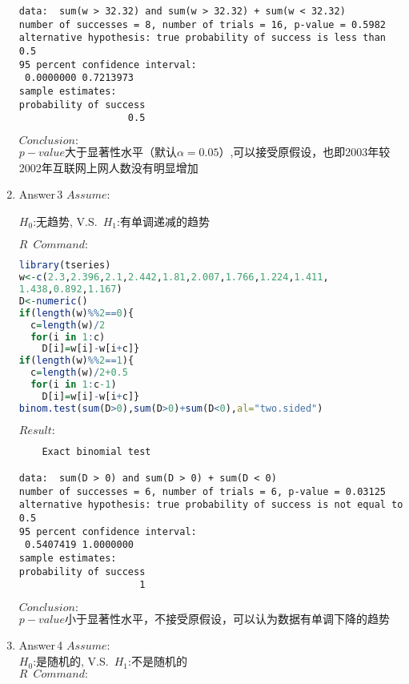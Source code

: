 \documentclass[UTF8,a4paper]{ctexart}
\begin{document}
\begin{enumerate}
\begin{verbatim}
data:  sum(w > 32.32) and sum(w > 32.32) + sum(w < 32.32)
number of successes = 8, number of trials = 16, p-value = 0.5982
alternative hypothesis: true probability of success is less than 0.5
95 percent confidence interval:
 0.0000000 0.7213973
sample estimates:
probability of success 
                   0.5 
\end{verbatim}
\textcolor[rgb]{0.28,0.9,0.8} {\large \textbf{$ Conclusion:$}}\\
$p-value$大于显著性水平（默认$\alpha =0.05$）,可以接受原假设，也即2003年较2002年互联网上网人数没有明显增加

\item Answer\,3
{\color{yellow} \large \textbf{$Assume:$}}\\
\begin{center}
\emph{$H_0$}:无趋势,\,\,V.S.\,\,\,\emph{$H_1$}:有单调递减的趋势
\end{center}
{\color{blue} \large \textbf{$R\,\,\, Command:$}}\\
\begin{lstlisting}[language=R]
library(tseries)
w<-c(2.3,2.396,2.1,2.442,1.81,2.007,1.766,1.224,1.411,
1.438,0.892,1.167)
D<-numeric()
if(length(w)%%2==0){
  c=length(w)/2
  for(i in 1:c)
    D[i]=w[i]-w[i+c]}
if(length(w)%%2==1){
  c=length(w)/2+0.5
  for(i in 1:c-1)
    D[i]=w[i]-w[i+c]}
binom.test(sum(D>0),sum(D>0)+sum(D<0),al="two.sided")
\end{lstlisting}
{\color{red} \large \textbf{$ Result:$}}\\
\begin{verbatim}
	Exact binomial test

data:  sum(D > 0) and sum(D > 0) + sum(D < 0)
number of successes = 6, number of trials = 6, p-value = 0.03125
alternative hypothesis: true probability of success is not equal to 0.5
95 percent confidence interval:
 0.5407419 1.0000000
sample estimates:
probability of success 
                     1 
\end{verbatim}
\textcolor[rgb]{0.28,0.9,0.8} {\large \textbf{$ Conclusion:$}}\\
$p-value$小于显著性水平，不接受原假设，可以认为数据有单调下降的趋势

\item Answer\,4
{\color{yellow} \large \textbf{$Assume:$}}\\
\emph{$H_0$}:是随机的,\,\,V.S.\,\,\,\emph{$H_1$}:不是随机的\\

{\color{blue} \large \textbf{$R\,\,\, Command:$}}\\


\end{enumerate}
\end{document}
